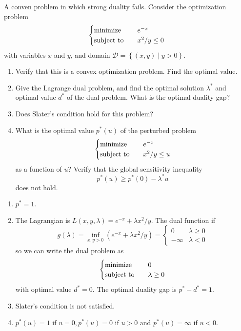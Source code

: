 \begin{problem}[5.21]
    A conven problem in which strong duality fails. Consider the optimization problem\[\begin{cases}
        \operatorname{minimize}\quad &e^{-x}\\
        \operatorname{subject\ to}\quad &x^2/y\le 0
    \end{cases}\]with variables $x$ and $y$, and domain $\mathcal{D} = \left\{(x, y)\mid y > 0\right\}$.
    \begin{enumerate}
        \item Verify that this is a convex optimization problem. Find the optimal value.
        \item Give the Lagrange dual problem, and find the optimal solution $\lambda^*$ and optimal value $d^*$ of the dual problem. What is the optimal duality gap?
        \item Does Slater's condition hold for this problem?
        \item What is the optimal value $p^*(u)$ of the perturbed problem\[\begin{cases}
            \operatorname{minimize}\quad &e^{-x}\\
            \operatorname{subject\ to}\quad &x^2/y \le u
        \end{cases}\] as a function of $u$? Verify that the global sensitivity inequality\[p^*(u) \ge p^*(0) - \lambda^*u\] does not hold.
    \end{enumerate}
    \Answer \text{}\begin{enumerate}
        \item $p^* = 1$.
        \item The Lagrangian is $L(x, y, \lambda) = e^{-x} + \lambda x^2/y$. The dual function if \[g(\lambda)=\inf _{x, y>0}\left(e^{-x}+\lambda x^{2} / y\right)=\left\{\begin{array}{ll}
            0 & \lambda \geq 0 \\
            -\infty & \lambda<0
        \end{array}\right.\] so we can write the dual problem as \[\begin{cases}
            \operatorname{minimize}\quad &0\\
            \operatorname{subject\ to}\quad & \lambda \ge 0
        \end{cases}\] with optimal value $d^* = 0$. The optimal duality gap is $p^* - d^* = 1$.
        \item Slater's condition is not satisfied.
        \item $p^*(u) = 1\text{ if } u = 0, p^*(u) = 0\text{ if } u > 0 \text{ and } p^*(u) = \infty \text{ if } u < 0$.
    \end{enumerate}
\end{problem}

